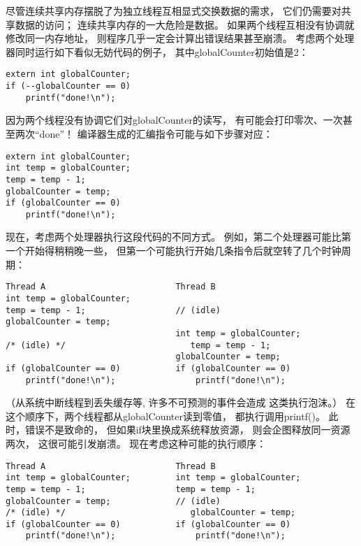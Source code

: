 尽管连续共享内存摆脱了为独立线程互相显式交换数据的需求，
它们仍需要对共享数据的访问；
连续共享内存的一大危险是数据。
如果两个线程互相没有协调就修改同一内存地址，
则程序几乎一定会计算出错误结果甚至崩溃。
考虑两个处理器同时运行如下看似无妨代码的例子，
其中{\ttfamily globalCounter}初始值是2：
\begin{lstlisting}
extern int globalCounter;
if (--globalCounter == 0)
    printf("done!\n");
\end{lstlisting}

因为两个线程没有协调它们对{\ttfamily globalCounter}的读写，
有可能会打印零次、一次甚至两次“done”！
编译器生成的汇编指令可能与如下步骤对应：
\begin{lstlisting}
extern int globalCounter;
int temp = globalCounter;
temp = temp - 1;
globalCounter = temp;
if (globalCounter == 0)
    printf("done!\n");
\end{lstlisting}

现在，考虑两个处理器执行这段代码的不同方式。
例如，第二个处理器可能比第一个开始得稍稍晚一些，
但第一个可能执行开始几条指令后就空转了几个时钟周期：
\begin{lstlisting}
Thread A                          Thread B
int temp = globalCounter;   
temp = temp - 1;                  // (idle)
globalCounter = temp;             
                                  int temp = globalCounter;
/* (idle) */                         temp = temp - 1;
                                  globalCounter = temp;
if (globalCounter == 0)           if (globalCounter == 0)
    printf("done!\n");                printf("done!\n");
\end{lstlisting}
（从系统中断线程到丢失缓存等,
许多不可预测的事件会造成
这类执行泡沫。）
在这个顺序下，两个线程都从{\ttfamily globalCounter}读到零值，
都执行调用{\ttfamily printf()}。
此时，错误不是致命的，
但如果{\ttfamily if}块里换成系统释放资源，
则会企图释放同一资源两次，
这很可能引发崩溃。
现在考虑这种可能的执行顺序：
\begin{lstlisting}
Thread A                          Thread B
int temp = globalCounter;         int temp = globalCounter;
temp = temp - 1;                  temp = temp - 1;
globalCounter = temp;             // (idle)
/* (idle) */                         globalCounter = temp;
if (globalCounter == 0)           if (globalCounter == 0)
    printf("done!\n");                printf("done!\n");
\end{lstlisting}


